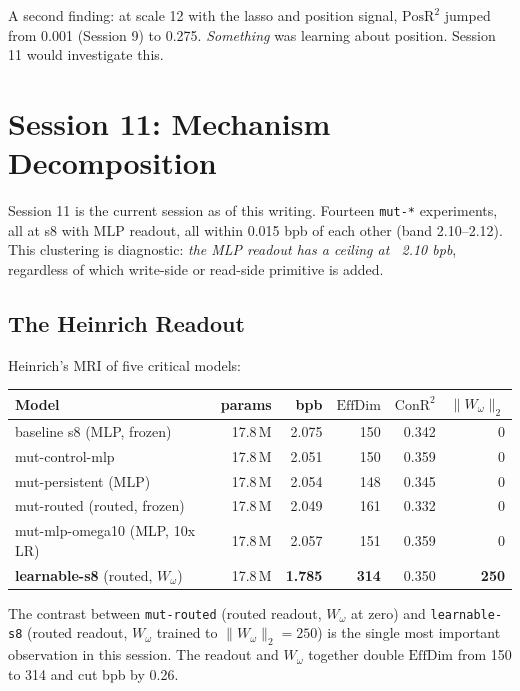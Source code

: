 \documentclass[11pt,openany]{book}
\theoremstyle{definition}
\theoremstyle{plain}
\newcommand{\effdim}{\mathrm{EffDim}}
\newcommand{\conr}{\mathrm{ConR^2}}
\newcommand{\posr}{\mathrm{PosR^2}}
\newcommand{\omegaproj}{W_\omega}
\begin{document}
A second finding: at scale 12 with the lasso and position signal, $\posr$
jumped from 0.001 (Session 9) to 0.275. \emph{Something} was learning
about position. Session 11 would investigate this.

\chapter{Session 11: Mechanism Decomposition}
\label{ch:session11}

Session 11 is the current session as of this writing. Fourteen \texttt{mut-*}
experiments, all at s8 with MLP readout, all within 0.015 bpb of each
other (band 2.10--2.12). This clustering is diagnostic: \emph{the MLP
readout has a ceiling at ~2.10 bpb}, regardless of which write-side or
read-side primitive is added.

\section{The Heinrich Readout}

Heinrich's MRI of five critical models:
\begin{center}
\begin{tabular}{lrrrrr}
\toprule
Model & params & bpb & $\effdim$ & $\conr$ & $\|\omegaproj\|_2$ \\
\midrule
baseline s8 (MLP, frozen)    & 17.8\,M & 2.075 & 150 & 0.342 & $0$ \\
mut-control-mlp              & 17.8\,M & 2.051 & 150 & 0.359 & $0$ \\
mut-persistent (MLP)         & 17.8\,M & 2.054 & 148 & 0.345 & $0$ \\
mut-routed (routed, frozen)  & 17.8\,M & 2.049 & 161 & 0.332 & $0$ \\
mut-mlp-omega10 (MLP, 10x LR)& 17.8\,M & 2.057 & 151 & 0.359 & $0$ \\
\textbf{learnable-s8} (routed, $\omegaproj$) & 17.8\,M & \textbf{1.785} & \textbf{314} & 0.350 & \textbf{250} \\
\bottomrule
\end{tabular}
\end{center}

The contrast between \texttt{mut-routed} (routed readout, $\omegaproj$ at
zero) and \texttt{learnable-s8} (routed readout, $\omegaproj$ trained to
$\|\omegaproj\|_2 = 250$) is the single most important observation in
this session. The readout and $\omegaproj$ together double $\effdim$ from
150 to 314 and cut bpb by 0.26.
\end{document}
